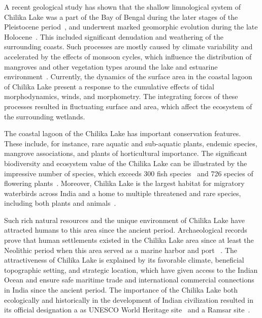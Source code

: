 \documentclass[jmse,article,accept,pdftex,oneauthor]{Definitions/mdpi}
\begin{document}
A recent geological study has shown that the shallow limnological system of Chilika Lake was a part of the Bay of Bengal during the later stages of the Pleistocene period~\cite{BOROLE1993761}, and underwent marked geomorphic evolution during the late Holocene~\cite{MISHRA2022457,AMIR2021148}. This included significant denudation and weathering of the surrounding coasts. Such processes are mostly caused by climate variability and accelerated by the effects of monsoon cycles, which influence the distribution of mangroves \cite{Nazneen2022} and other vegetation types around the lake and estuarine environment~\cite{DASH2023106754}. Currently, the dynamics of the surface area in the coastal lagoon of Chilika Lake present a response to the cumulative effects of tidal morphodynamics, winds, and morphometry. The integrating forces of these processes resulted in fluctuating surface and area, which affect the ecosystem of the surrounding wetlands.

The coastal lagoon of the Chilika Lake has important conservation features. These include, for instance, rare aquatic and sub-aquatic plants, endemic species, mangrove associations, and plants of horticultural importance. The significant biodiversity and ecosystem value of the Chilika Lake can be illustrated by the impressive number of species, which exceeds 300 fish species~\cite{MOHAPATRA2015195} and 726 species of flowering plants~\cite{Sarkar2012}. Moreover, Chilika Lake is the largest habitat for migratory waterbirds across India and a home to multiple threatened and rare species, including both plants and animals~\cite{Balachandran2020}. 

Such rich natural resources and the unique environment of Chilika Lake have attracted humans to this area since the ancient period. Archaeological records prove  that human settlements existed in the Chilika Lake area since at least the Neolithic period when this area served as a marine harbor and port ~\cite{DASH2022105190}. The attractiveness of   Chilika Lake is explained by its favorable climate, beneficial topographic setting, and strategic location, which have given access to the Indian Ocean and ensure safe maritime trade and international commercial connections in India since the ancient period. The importance of the Chilika Lake   both ecologically  and historically  in the development of Indian civilization resulted in its official  designation a as UNESCO World Heritage site~\cite{SETHY2023497} and a Ramsar site~\cite{BHUVANAGIRI2018343}.

\end{document}
